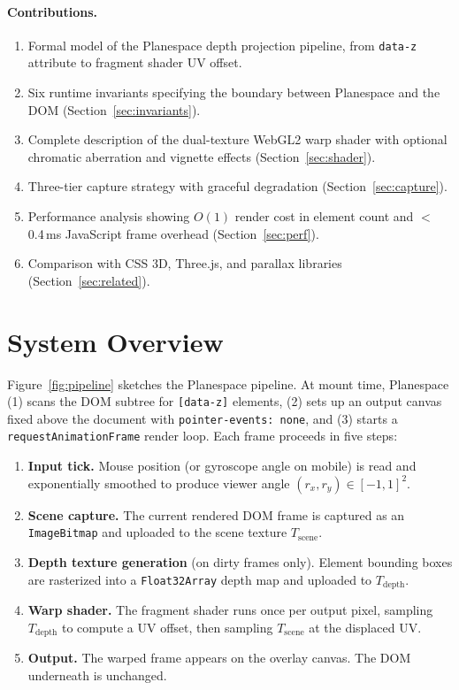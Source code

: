 \documentclass[10pt,twocolumn]{article}
\newcommand{\rx}{r_x}
\newcommand{\ry}{r_y}
\newcommand{\Tscene}{T_{\mathrm{scene}}}
\newcommand{\Tdepth}{T_{\mathrm{depth}}}
\begin{document}
\paragraph{Contributions.}
\begin{enumerate}[leftmargin=*,topsep=2pt]
  \item Formal model of the Planespace depth projection pipeline, from
        \texttt{data-z} attribute to fragment shader UV offset.
  \item Six runtime invariants specifying the boundary between Planespace and
        the DOM (Section~\ref{sec:invariants}).
  \item Complete description of the dual-texture WebGL2 warp shader with
        optional chromatic aberration and vignette effects
        (Section~\ref{sec:shader}).
  \item Three-tier capture strategy with graceful degradation
        (Section~\ref{sec:capture}).
  \item Performance analysis showing $O(1)$ render cost in element count and
        $<$\,0.4\,ms JavaScript frame overhead (Section~\ref{sec:perf}).
  \item Comparison with CSS 3D, Three.js, and parallax libraries
        (Section~\ref{sec:related}).
\end{enumerate}

\section{System Overview}
\label{sec:overview}

Figure~\ref{fig:pipeline} sketches the Planespace pipeline. At mount time,
Planespace (1) scans the DOM subtree for \texttt{[data-z]} elements,
(2) sets up an output canvas fixed above the document with
\texttt{pointer-events: none}, and (3) starts a
\texttt{requestAnimationFrame} render loop. Each frame proceeds in five
steps:

\begin{enumerate}[topsep=2pt]
  \item \textbf{Input tick.} Mouse position (or gyroscope angle on mobile)
        is read and exponentially smoothed to produce viewer angle
        $(\rx, \ry) \in [-1, 1]^2$.
  \item \textbf{Scene capture.} The current rendered DOM frame is captured
        as an \texttt{ImageBitmap} and uploaded to the scene texture
        $\Tscene$.
  \item \textbf{Depth texture generation} (on dirty frames only). Element
        bounding boxes are rasterized into a \texttt{Float32Array} depth map
        and uploaded to $\Tdepth$.
  \item \textbf{Warp shader.} The fragment shader runs once per output pixel,
        sampling $\Tdepth$ to compute a UV offset, then sampling $\Tscene$
        at the displaced UV.
  \item \textbf{Output.} The warped frame appears on the overlay canvas.
        The DOM underneath is unchanged.
\end{enumerate}
\end{document}
